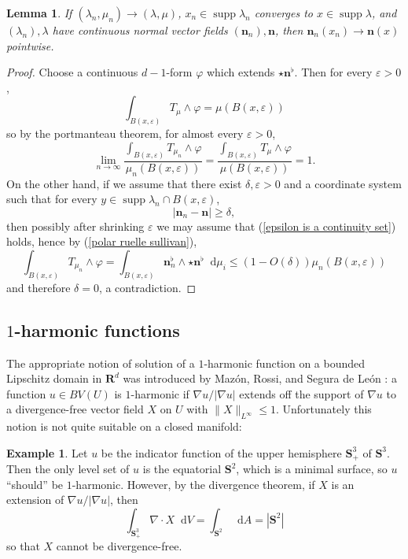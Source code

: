 \documentclass[reqno,11pt]{amsart}
\newcommand{\RR}{\mathbf{R}}
\newcommand{\Sph}{\mathbf S}
\newcommand*\dif{\mathop{}\!\mathrm{d}}
\DeclareMathOperator{\supp}{supp}
\newcommand{\normal}{\mathbf n}
\newtheorem{lemma}[theorem]{Lemma}
\theoremstyle{definition}
\newtheorem{example}[theorem]{Example}
\numberwithin{equation}{section}
\begin{document}
\begin{lemma}\label{convergence of normals}
If $(\lambda_n, \mu_n) \to (\lambda, \mu)$, $x_n \in \supp \lambda_n$ converges to $x \in \supp \lambda$, and $(\lambda_n), \lambda$ have continuous normal vector fields $(\normal_n), \normal$, then $\normal_n(x_n) \to \normal(x)$ pointwise.
\end{lemma}
\begin{proof}
	Choose a continuous $d-1$-form $\varphi$ which extends $\star \normal^\flat$.
	Then for every $\varepsilon > 0$,
	$$\int_{B(x, \varepsilon)} T_\mu \wedge \varphi = \mu(B(x, \varepsilon))$$
	so by the portmanteau theorem, for almost every $\varepsilon > 0$,
	\begin{equation}\label{epsilon is a continuity set}
		\lim_{n \to \infty} \frac{\int_{B(x, \varepsilon)} T_{\mu_n} \wedge \varphi}{\mu_n(B(x, \varepsilon))} = \frac{\int_{B(x, \varepsilon)} T_\mu \wedge \varphi}{\mu(B(x, \varepsilon))} = 1.
	\end{equation}
	On the other hand, if we assume that there exist $\delta, \varepsilon > 0$ and a coordinate system such that for every $y \in \supp \lambda_n \cap B(x, \varepsilon)$,
	$$|\normal_n - \normal| \geq \delta,$$
	then possibly after shrinking $\varepsilon$ we may assume that (\ref{epsilon is a continuity set}) holds, hence by (\ref{polar ruelle sullivan}),
	$$\int_{B(x, \varepsilon)} T_{\mu_n} \wedge \varphi = \int_{B(x, \varepsilon)} \normal_n^\flat \wedge \star \normal^\flat \dif \mu_i \leq (1 - O(\delta)) \mu_n(B(x, \varepsilon))$$
	and therefore $\delta = 0$, a contradiction.
\end{proof}

\subsection{\texorpdfstring{$1$-harmonic}{One-harmonic} functions}
The appropriate notion of solution of a $1$-harmonic function on a bounded Lipschitz domain in $\RR^d$ was introduced by Maz\'on, Rossi, and Segura de Le\'on \cite{Mazon14}: a function $u \in BV(U)$ is $1$-harmonic if $\nabla u/|\nabla u|$ extends off the support of $\nabla u$ to a divergence-free vector field $X$ on $U$ with $\|X\|_{L^\infty} \leq 1$.
Unfortunately this notion is not quite suitable on a closed manifold:

\begin{example}
Let $u$ be the indicator function of the upper hemisphere $\Sph^3_+$ of $\Sph^3$.
Then the only level set of $u$ is the equatorial $\Sph^2$, which is a minimal surface, so $u$ ``should'' be $1$-harmonic.
However, by the divergence theorem, if $X$ is an extension of $\nabla u/|\nabla u|$, then
$$\int_{\Sph^3_+} \nabla \cdot X \dif V = \int_{\Sph^2} \dif A = |\Sph^2|$$
so that $X$ cannot be divergence-free.
\end{example}
\end{document}
